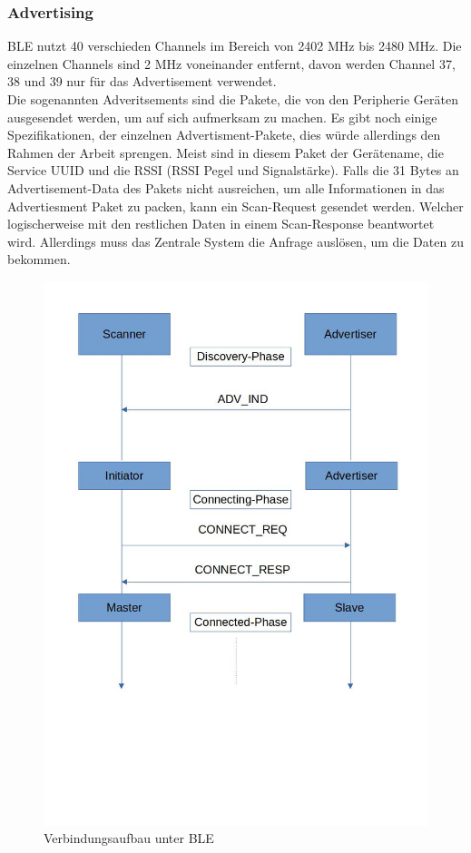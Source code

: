 \documentclass[a4paper,11pt,singlespacing]{article}
\begin{document}
		\subsubsection{Advertising}
		BLE nutzt 40 verschieden Channels im Bereich von 2402 MHz bis 2480 MHz. Die einzelnen Channels sind 2 MHz voneinander entfernt, davon werden Channel 37, 38 und 39 nur für das Advertisement verwendet. \\
		Die sogenannten Adveritsements sind die Pakete, die von den Peripherie Geräten ausgesendet werden, um auf sich aufmerksam zu machen. Es gibt noch einige Spezifikationen, der einzelnen Advertisment-Pakete, dies würde allerdings den Rahmen der Arbeit sprengen. Meist sind in diesem Paket der Gerätename, die Service UUID und die RSSI (RSSI Pegel und Signalstärke). Falls die 31 Bytes an Advertisement-Data des Pakets nicht ausreichen, um alle Informationen in das Advertiesment Paket zu packen, kann ein Scan-Request gesendet werden. Welcher logischerweise mit den restlichen Daten in einem Scan-Response beantwortet wird. Allerdings muss das Zentrale System die Anfrage auslösen, um die Daten zu bekommen.
		\begin{figure}[ht]
			\centering
			\includegraphics[scale=0.4]{Connection_BLE}
			\caption{Verbindungsaufbau unter BLE}
			\label{connect}
		\end{figure}
\end{document}
